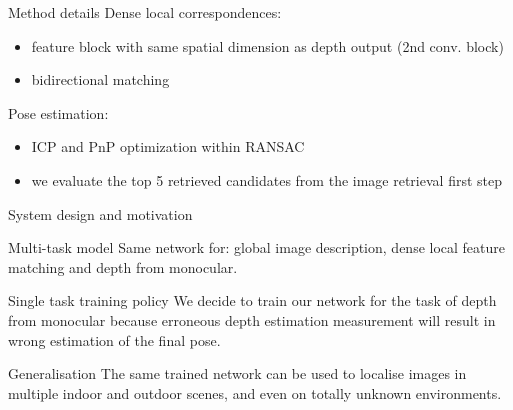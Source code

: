 \begin{frame}{Method details}
	Dense local correspondences:
	\begin{itemize}
		\item feature block with same spatial dimension as depth output (2nd conv. block)
		\item bidirectional matching
	\end{itemize}

	\vfill	
	
	{
	Pose estimation:
	\begin{itemize}
		\item ICP and PnP optimization within RANSAC
		\item we evaluate the top 5 retrieved candidates from the image retrieval first step
	\end{itemize}
	}
\end{frame}

\begin{frame}{System design and motivation}
	\begin{block}{Multi-task model}
		Same network for: global image description, dense local feature matching and depth from monocular.
	\end{block}
	\vfill
	{
		\begin{block}{Single task training policy}
			We decide to train our network for the task of depth from monocular because erroneous depth estimation measurement will result in wrong estimation of the final pose.
		\end{block}
	}
	\vfill
	{
		\begin{block}{Generalisation}
			The same trained network can be used to localise images in multiple indoor and outdoor scenes, and even on totally unknown environments.
		\end{block}
	}
\end{frame}

